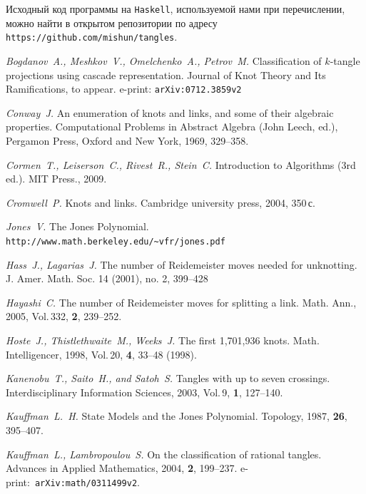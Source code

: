 \documentclass[12pt]{article}
\theoremstyle{plain}
\theoremstyle{definition}
\begin{document}
		Исходный код программы на \texttt{Haskell}, используемой нами при перечислении, можно найти в открытом репозитории по
		адресу \texttt{https://github.com/mishun/tangles}.

	\newpage
	\begin{thebibliography}{88}

		{\em Bogdanov~A., Meshkov~V., Omelchenko~A., Petrov~M.}
		Classification of $k$-tangle projections using cascade representation.
		Journal of Knot Theory and Its Ramifications, to appear.
		e-print: \texttt{arXiv:0712.3859v2}

		{\em Conway~J.}
		An enumeration of knots and links, and some of their algebraic properties.
		Computational Problems in Abstract Algebra (John Leech, ed.), Pergamon Press, Oxford
		and New York, 1969, 329--358.

		{\em Cormen~T., Leiserson~C., Rivest~R., Stein~C.}
		Introduction to Algorithms (3rd ed.).
		MIT Press., 2009.

		{\em Cromwell~P.}
		Knots and links.
		Cambridge university press, 2004, 350\,с.

		{\em Jones~V.}
		The Jones Polynomial.
		\texttt{http://www.math.berkeley.edu/\textasciitilde vfr/jones.pdf}

		{\em Hass~J., Lagarias~J.}
		The number of Reidemeister moves needed for unknotting.
		J. Amer. Math. Soc. 14 (2001), no. 2, 399--428

		{\em Hayashi~C.}
		The number of Reidemeister moves for splitting a link.
		Math. Ann., 2005, Vol.\,332, {\bf 2}, 239--252.

		{\em Hoste~J., Thistlethwaite~M., Weeks~J.}
		The first 1,701,936 knots.
		Math. Intelligencer, 1998, Vol.\,20, {\bf 4}, 33--48 (1998).

		{\em Kanenobu~T., Saito~H., and Satoh~S.}
		Tangles with up to seven crossings.
		Interdisciplinary Information Sciences, 2003, Vol.\,9, {\bf 1}, 127--140.

		{\em Kauffman~L.~H.}
		State Models and the Jones Polynomial.
		Topology, 1987, {\bf 26}, 395--407.

		{\em Kauffman~L., Lambropoulou~S.}
		On the classification of rational tangles.
		Advances in Applied Mathematics, 2004, {\bf 2}, 199--237.
		e-print:~\texttt{arXiv:math/0311499v2}.


\end{thebibliography}
\end{document}
